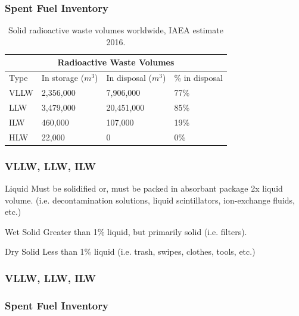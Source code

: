 

\begin{frame}[fragile]
        \frametitle{Spent Fuel Inventory}
    \begin{table}
      \centering
      \begin{tabular}{l|lll}
        \multicolumn{4}{c}{\textbf{Radioactive Waste Volumes}}\\
        \hline
Type & In storage ($m^3$) & In disposal ($m^3$)  &  \% in disposal\\
        \hline
VLLW &   2,356,000 &   7,906,000  &  77\%\\
LLW  &  3,479,000  &  20,451,000 &   85\%\\
ILW  &  460,000  &  107,000  &  19\%\\
HLW  &  22,000 &   0   & 0\%\\
        \hline
      \end{tabular}
      \caption[SNF volumes]{Solid radioactive waste volumes worldwide, IAEA 
      estimate 2016. \cite{iaea}}
      \label{tab:vol}
    \end{table}
    \end{frame}

\begin{frame}[fragile]
        \frametitle{VLLW, LLW, ILW}
        \begin{block}{Liquid}
                Must be solidified or, must be packed in absorbant package 2x liquid volume.
                (i.e. decontamination solutions, liquid scintillators, 
                ion-exchange fluids, etc.)
        \end{block}
        \begin{block}{Wet Solid}
                Greater than 1\% liquid, but primarily solid (i.e. filters).
        \end{block}
        \begin{block}{Dry Solid}
                        Less than 1\% liquid (i.e. trash, swipes, clothes, 
                        tools, etc.)
        \end{block}
\end{frame}


\begin{frame}[fragile]
        \frametitle{VLLW, LLW, ILW}
                
\end{frame}

\begin{frame}[fragile]
        \frametitle{Spent Fuel Inventory}
                
\end{frame}

